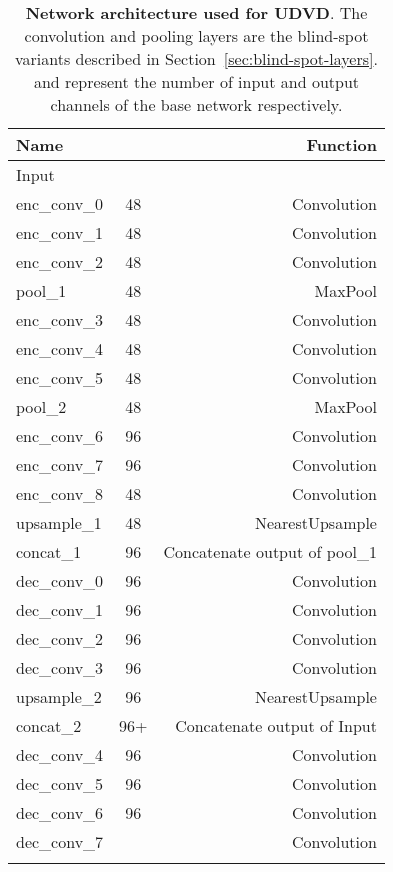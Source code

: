\documentclass[final]{cvpr}
\begin{document}
\begin{table}[]
    \centering
    \begin{tabular}{lcr}
        \toprule
        Name &  & Function \\
        \midrule
        Input &  & \\
        enc\_conv\_0 & 48 & Convolution  \\
        enc\_conv\_1 & 48 & Convolution  \\
        enc\_conv\_2 & 48 & Convolution  \\
        pool\_1 & 48 & MaxPool  \\
        enc\_conv\_3 & 48 & Convolution  \\
        enc\_conv\_4 & 48 & Convolution  \\
        enc\_conv\_5 & 48 & Convolution  \\
        pool\_2 & 48 & MaxPool  \\
        enc\_conv\_6 & 96 & Convolution  \\
        enc\_conv\_7 & 96 & Convolution  \\
        enc\_conv\_8 & 48 & Convolution  \\
        upsample\_1 & 48 & NearestUpsample  \\
        concat\_1 & 96 & Concatenate output of pool\_1 \\
        dec\_conv\_0 & 96 & Convolution  \\
        dec\_conv\_1 & 96 & Convolution  \\
        dec\_conv\_2 & 96 & Convolution  \\
        dec\_conv\_3 & 96 & Convolution  \\
        upsample\_2 & 96 & NearestUpsample  \\
        concat\_2 & 96+ & Concatenate output of Input \\
        dec\_conv\_4 & 96 & Convolution  \\
        dec\_conv\_5 & 96 & Convolution  \\
        dec\_conv\_6 & 96 & Convolution  \\
        dec\_conv\_7 &  & Convolution  \\ 
        \bottomrule \\
    \end{tabular}
    \caption{\textbf{Network architecture used for UDVD}. The convolution and pooling layers are the blind-spot variants described in Section~\ref{sec:blind-spot-layers}.  and  represent the number of input and output channels of the base network respectively.}
    \label{tab:net_arch}
\end{table}
\end{document}
